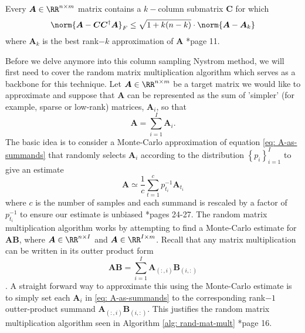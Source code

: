 \begin{thm} \label{lem: best-col-sel}
    Every $\bm{A} \in \RR^{n \times m}$ matrix contains a $k-$column submatrix $\bm{C}$ for which
    \[
        \norm{\bm{A} - \bm{C} \bm{C}^{\dagger} \bm{A}}_{F} \leq \sqrt{1 + k(n-k)} \cdot \norm{\bm{A} - \bm{A}_{k}}
    \]
    where $\bm{A}_k$ is the best rank$-k$ approximation of $\bm{A}$ \cite{halko2011finding}*{page 11}.
\end{thm}
Before we delve anymore into this column sampling Nystrom method, we will first need to cover the random matrix multiplication algorithm which serves as a backbone for this technique. Let $\bm{A} \in \RR^{n \times m}$ be a target matrix we would like to approximate and suppose that $\bm{A}$ can be represented as the sum of 'simpler' (for example, sparse or low-rank) matrices, $\bm{A}_i$, so that
\begin{equation} \label{eq: A-as-summands}
    \bm{A} = \sum_{i=1}^{I} \bm{A}_i .
\end{equation}
The basic idea is to consider a Monte-Carlo approximation of equation \ref{eq: A-as-summands} that randomly selects $\bm{A}_i$ according to the distribution $\left\{ p_i \right\}_{i=1}^{I}$ to give an estimate
\begin{equation}
    \bm{A} \simeq \frac{1}{c} \sum_{t=1}^{c} p_{t_i}^{-1} \bm{A}_{t_i}
\end{equation}
where $c$ is the number of samples and each summand is rescaled by a factor of $p_{t_i}^{-1}$ to ensure our estimate is unbiased \cite{martinsson2021randomized}*{pages 24-27}. The random matrix multiplication algorithm works by attempting to find a Monte-Carlo estimate for $\bm{A}\bm{B}$, where $\bm{A} \in \RR^{n \times I}$ and $\bm{A} \in \RR^{I \times m}$. Recall that any matrix multiplication can be written in its outter product form
\begin{equation*}
    \bm{A} \bm{B} = \sum_{i=1}^{I} \bm{A}_{(:,i)} \bm{B}_{(i,:)}
\end{equation*}
\cite{Roosta2020, doi:10.1137/S0097539704442684}. A straight forward way to approximate this using the Monte-Carlo estimate is to simply set each $\bm{A}_i$ in \ref{eq: A-as-summands} to the corresponding rank$-1$ outter-product summand $\bm{A}_{(:,i)} \bm{B}_{(i,:)}$. This justifies the random matrix multiplication algorithm seen in Algorithm \ref{alg: rand-mat-mult} \cite{drineas2017lectures}*{page 16}.
